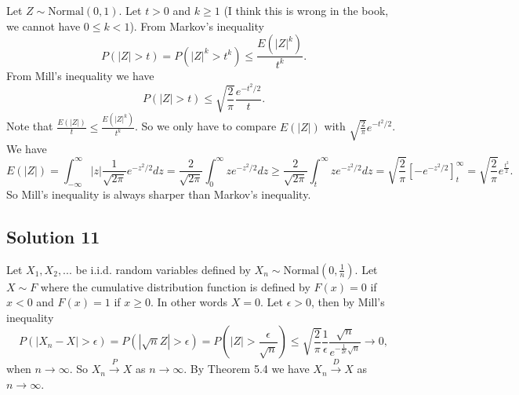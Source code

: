 Let $Z \sim \mathrm{Normal}(0, 1)$.
Let $t > 0$ and $k \geq 1$ (I think this is wrong in the book, we cannot have $0 \leq k < 1$).
From Markov's inequality
\begin{equation*}
    P(|Z| > t) = P(|Z|^k > t^k)
        \leq \frac{E(|Z|^k)}{t^k}.
\end{equation*}
From Mill's inequality we have
\begin{equation*}
    P(|Z| > t) \leq \sqrt{\frac{2}{\pi}} \frac{e^{-t^2/2}}{t}.
\end{equation*}
Note that $\frac{E(|Z|)}{t} \leq \frac{E(|Z|^k)}{t^k}$.
So we only have to compare $E(|Z|)$ with $\sqrt{\frac{2}{\pi}} e^{-t^2/2}$.
We have
\begin{equation*}
    E(|Z|) = \int_{-\infty}^{\infty} |z| \frac{1}{\sqrt{2\pi}} e^{-z^2/2} dz
        = \frac{2}{\sqrt{2\pi}} \int_0^{\infty} z e^{-z^2/2} dz
        \geq \frac{2}{\sqrt{2\pi}} \int_t^{\infty} z e^{-z^2/2} dz
        = \sqrt{\frac{2}{\pi}} \left[ -e^{-z^2/2} \right]_{t}^{\infty}
        = \sqrt{\frac{2}{\pi}} e^{\frac{t^2}{2}}.
\end{equation*}
So Mill's inequality is always sharper than Markov's inequality.


\subsection*{Solution 11}

Let $X_1, X_2, ...$ be i.i.d. random variables defined by $X_n \sim \mathrm{Normal}(0, \frac{1}{n})$.
Let $X \sim F$ where the cumulative distribution function is defined by $F(x) = 0$ if $x < 0$ and $F(x) = 1$ if $x \geq 0$.
In other words $X = 0$.
Let $\epsilon > 0$, then by Mill's inequality
\begin{equation*}
    P(|X_n - X| > \epsilon) = P(|\sqrt{n} Z| > \epsilon)
        = P(|Z| > \frac{\epsilon}{\sqrt{n}})
        \leq \sqrt{\frac{2}{\pi}} \frac{1}{\epsilon} \frac{\sqrt{n}}{e^{-\frac{1}{2\epsilon} \sqrt{n}}}
        \to 0,
\end{equation*}
when $n \to \infty$.
So $X_n \xrightarrow{P} X$ as $n \to \infty$.
By Theorem 5.4 we have $X_n \xrightarrow{D} X$ as $n \to \infty$.
